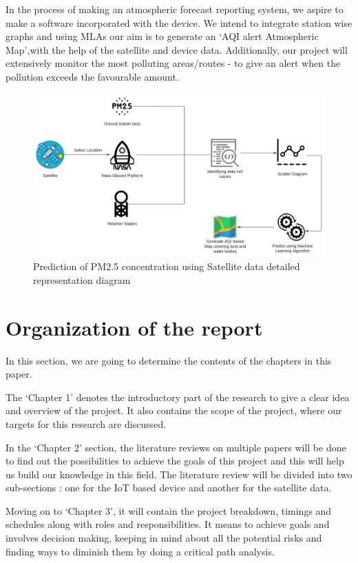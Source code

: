 In the process of making an atmospheric forecast reporting system, we aspire to make a software incorporated with the device. We intend to integrate station wise graphs and using MLAs our aim is to generate an ‘AQI alert Atmospheric Map’,with the help of the satellite and device data. Additionally, our project will extensively monitor the most polluting areas/routes - to give an alert when the pollution exceeds the favourable amount.

\begin{figure} [H]
    \centering
    \includegraphics[width=\textwidth]{images/1_3_System Design Satellite .jpeg}
    \caption{Prediction of PM2.5 concentration using Satellite data detailed representation diagram}
    \label{fig:System Design Satellite}
\end{figure}

\section{Organization of the report}

In this section, we are going to determine the contents of the chapters in this paper. 

The ‘Chapter 1’ denotes the introductory part of the research to give a clear idea and overview of the project. It also contains the scope of the project, where our targets for this research are discussed.

In the ‘Chapter 2’ section, the literature reviews on multiple papers will be done to find out the possibilities to achieve the goals of this project and this will help us build our knowledge in this field. The literature review will be divided into two sub-sections : one for the IoT based device and another for the satellite data.

Moving on to ‘Chapter 3’, it will contain the project breakdown, timings and schedules along with roles and responsibilities. It means to achieve goals and involves decision making, keeping in mind about all the potential risks and finding ways to diminish them by doing a critical path analysis.

